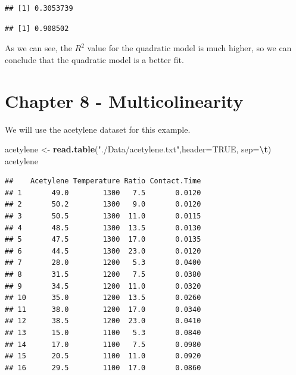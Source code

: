 \documentclass[
  11pt,
]{article}
\newenvironment{Shaded}{\begin{snugshade}}{\end{snugshade}}
\newcommand{\AttributeTok}[1]{\textcolor[rgb]{0.13,0.29,0.53}{#1}}
\newcommand{\ConstantTok}[1]{\textcolor[rgb]{0.56,0.35,0.01}{#1}}
\newcommand{\FunctionTok}[1]{\textcolor[rgb]{0.13,0.29,0.53}{\textbf{#1}}}
\newcommand{\NormalTok}[1]{#1}
\newcommand{\OtherTok}[1]{\textcolor[rgb]{0.56,0.35,0.01}{#1}}
\newcommand{\SpecialCharTok}[1]{\textcolor[rgb]{0.81,0.36,0.00}{\textbf{#1}}}
\newcommand{\StringTok}[1]{\textcolor[rgb]{0.31,0.60,0.02}{#1}}
\begin{document}
\begin{verbatim}
## [1] 0.3053739
\end{verbatim}

\begin{Shaded}
\end{Shaded}

\begin{verbatim}
## [1] 0.908502
\end{verbatim}

As we can see, the \(R^2\) value for the quadratic model is much higher,
so we can conclude that the quadratic model is a better fit.

\section{Chapter 8 -
Multicolinearity}\label{chapter-8---multicolinearity}

We will use the acetylene dataset for this example.

\begin{Shaded}
\begin{Highlighting}[]
\NormalTok{acetylene }\OtherTok{\textless{}{-}} \FunctionTok{read.table}\NormalTok{(}\StringTok{"./Data/acetylene.txt"}\NormalTok{,}\AttributeTok{header=}\ConstantTok{TRUE}\NormalTok{, }\AttributeTok{sep=}\StringTok{\textquotesingle{}}\SpecialCharTok{\textbackslash{}t}\StringTok{\textquotesingle{}}\NormalTok{)}
\NormalTok{acetylene}
\end{Highlighting}
\end{Shaded}

\begin{verbatim}
##    Acetylene Temperature Ratio Contact.Time
## 1       49.0        1300   7.5       0.0120
## 2       50.2        1300   9.0       0.0120
## 3       50.5        1300  11.0       0.0115
## 4       48.5        1300  13.5       0.0130
## 5       47.5        1300  17.0       0.0135
## 6       44.5        1300  23.0       0.0120
## 7       28.0        1200   5.3       0.0400
## 8       31.5        1200   7.5       0.0380
## 9       34.5        1200  11.0       0.0320
## 10      35.0        1200  13.5       0.0260
## 11      38.0        1200  17.0       0.0340
## 12      38.5        1200  23.0       0.0410
## 13      15.0        1100   5.3       0.0840
## 14      17.0        1100   7.5       0.0980
## 15      20.5        1100  11.0       0.0920
## 16      29.5        1100  17.0       0.0860
\end{verbatim}
\end{document}
